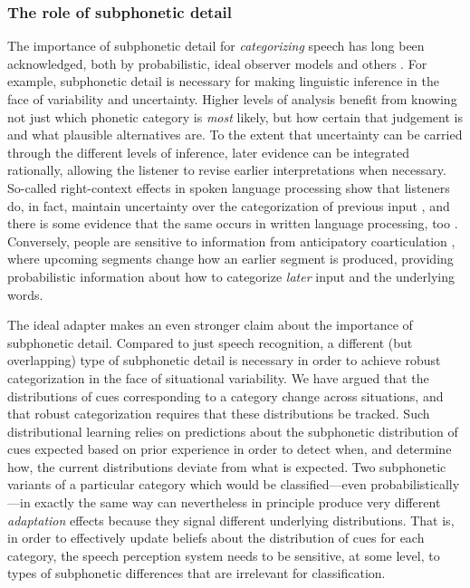 \subsubsection{The role of subphonetic detail}
\label{sec:impl-role-subph}

\label{r3-subphonetic-classification}
The importance of subphonetic detail for \emph{categorizing} speech has long been acknowledged, both by probabilistic, ideal observer models \autocite{Clayards2008,Feldman2009a,Norris2008,Sonderegger2010} and others \autocite{McClelland1986,Norris1994,Norris2000}.  For example, subphonetic detail is necessary for making linguistic inference in the face of variability and uncertainty.  Higher levels of analysis benefit from knowing not just which phonetic category is \emph{most} likely, but how certain that judgement is and what plausible alternatives are.  To the extent that uncertainty can be carried through the different levels of inference, later evidence can be integrated rationally, allowing the listener to revise earlier interpretations when necessary.
So-called right-context effects in spoken language processing show that listeners do, in fact, maintain uncertainty over the categorization of previous input \autocite{Bard1988,Connine1991,Dahan2010,Grosjean1985}, and there is some evidence that the same occurs in written language processing, too \autocite{Levy2009}.  Conversely, people are sensitive to information from anticipatory coarticulation \autocite{Dahan2001a,Marslen-Wilson1994a,McQueen1999,Whalen1984}, where upcoming segments change how an earlier segment is produced, providing probabilistic information about how to categorize \emph{later} input and the underlying words.  

\label{r3-subphon-beyond-class}
The ideal adapter makes an even stronger claim about the importance of subphonetic detail.  Compared to just speech recognition, a different (but overlapping) type of subphonetic detail is necessary in order to achieve robust categorization in the face of situational variability.  We have argued that the distributions of cues corresponding to a category change across situations, and that robust categorization requires that these distributions be tracked.  Such distributional learning relies on predictions about the subphonetic distribution of cues expected based on prior experience in order to detect when, and determine how, the current distributions deviate from what is expected.
Two subphonetic variants of a particular category which would be classified---even probabilistically---in exactly the same way can nevertheless in principle produce very different \emph{adaptation} effects because they signal different underlying distributions.  That is, in order to effectively update beliefs about the distribution of cues for each category, the speech perception system needs to be sensitive, at some level, to types of subphonetic differences that are irrelevant for classification.


